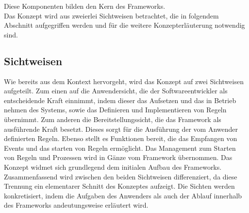         Diese Komponenten bilden den Kern des Frameworks.
        \\
        \linebreak
        Das Konzept wird aus zweierlei Sichtweisen betrachtet, die in folgendem Abschnitt aufgegriffen werden und für die weitere 
        Konzepterläuterung notwendig sind.
    
    \subsection{Sichtweisen}
    \label{subsec:sichtweisen}
        Wie bereits aus dem Kontext hervorgeht, wird das Konzept auf zwei Sichtweisen aufgeteilt. Zum einen auf die 
        Anwendersicht, die der Softwareentwickler als entscheidende Kraft einnimmt, indem dieser das Aufsetzen und das in 
        Betrieb nehmen des Systems, sowie das Definieren und Implementieren von Regeln übernimmt. Zum anderen die 
        Bereitstellungssicht, die das Framework als ausführende Kraft besetzt. Dieses sorgt für die Ausführung der vom 
        Anwender definierten Regeln. Ebenso stellt es Funktionen bereit, die das Empfangen von Events und das starten 
        von Regeln ermöglicht. Das Management zum Starten von Regeln und Prozessen wird in Gänze vom Framework übernommen. 
        Das Konzept widmet sich grundlegend dem initialen Aufbau des Frameworks. %
        \\
        \linebreak
        Zusammenfassend wird zwischen den beiden Sichtweisen differenziert, da diese Trennung ein elementarer Schnitt des Konzeptes 
        aufzeigt. Die Sichten werden konkretisiert, indem die Aufgaben des Anwenders als auch der Ablauf innerhalb des Frameworks 
        andeutungsweise erläutert wird.
        \\
        \linebreak
